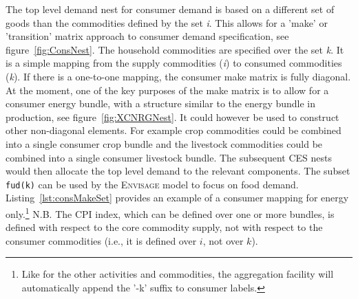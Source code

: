 The top level demand nest for consumer demand is based on a different set of
goods than the commodities defined by the set \emph{i}. This allows for a 'make'
or 'transition' matrix approach to consumer demand specification, see
figure~\ref{fig:ConsNest}. The household commodities are specified over the set
\emph{k}. It is a simple mapping from the supply commodities (\emph{i}) to
consumed commodities (\emph{k}). If there is a one-to-one mapping, the consumer
make matrix is fully diagonal. At the moment, one of the key purposes of the
make matrix is to allow for a consumer energy bundle, with a structure similar
to the energy bundle in production, see figure~\ref{fig:XCNRGNest}. It could
however be used to construct other non-diagonal elements. For example crop
commodities could be combined into a single consumer crop bundle and the
livestock commodities could be combined into a single consumer livestock bundle.
The subsequent CES nests would then allocate the top level demand to the
relevant components. The subset \texttt{fud(k)} can be used by the
\textsc{Envisage} model to focus on food demand. Listing~\ref{lst:consMakeSet}
provides an example of a consumer mapping for energy only.\footnote{Like for the
other activities and commodities, the aggregation facility will automatically
append the '-k' suffix to consumer labels.} N.B. The CPI index, which
can be defined over one or more bundles, is defined with respect
to the core commodity supply, not with respect to the consumer commodities
(i.e., it is defined over $i$, not over $k$).


